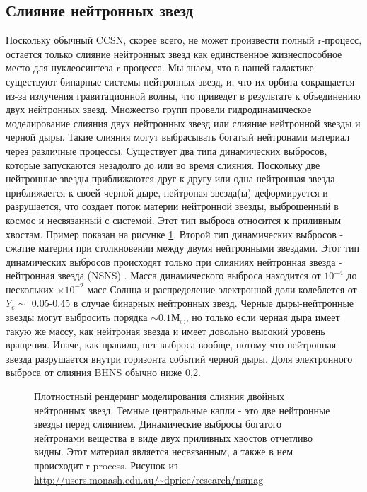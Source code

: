 \documentclass[%
master,    %
natbib,      %
subf,        %
href,        %
colorlinks,  %
]{disser}
\begin{document}
\subsection{Слияние нейтронных звезд}

Поскольку обычный CCSN, скорее всего, не может произвести полный r-процесс, остается только слияние нейтронных звезд как единственное жизнеспособное место для нуклеосинтеза r-процесса. Мы знаем, что в нашей галактике существуют бинарные системы нейтронных звезд, и, что их орбита сокращается из-за излучения гравитационной волны, что приведет в результате к объединению двух нейтронных звезд. Множество групп провели гидродинамическое моделирование слияния двух нейтронных звезд или слияние нейтронной звезды и черной дыры. Такие слияния могут выбрасывать богатый нейтронами материал через различные процессы. Существует два типа динамических выбросов, которые запускаются незадолго до или во время слияния. Поскольку две нейтронные звезды приближаются друг к другу или одна нейтронная звезда приближается к своей черной дыре, нейтроная звезда(ы) деформируется и разрушается, что создает поток материи нейтронной звезды, выброшенный в космос и несвязанный с системой. Этот тип выброса относится к приливным хвостам. Пример показан на рисунке \ref{ris:11}. Второй тип динамических выбросов - сжатие материи при столкновении между двумя нейтронными звездами. Этот тип динамических выбросов происходят только при слияниях нейтронная звезда - нейтронная звезда (NSNS) \cite{nsns}. Масса динамического выброса находится от $10^{-4}$ до нескольких $\times 10^{-2}$ масс Солнца и распределение электронной доли колеблется от $Y_e \sim$ 0.05-0.45 в случае бинарных нейтронных звезд. Черные дыры-нейтронные звезды могут выбросить порядка $\sim 0.1 М_\odot$, но только если черная дыра имеет такую же массу, как нейтроная звезда и имеет довольно высокий уровень вращения. Иначе, как правило, нет выброса вообще, потому что нейтронная звезда разрушается внутри горизонта событий черной дыры. Доля электронного выброса от слияния BHNS обычно ниже 0,2.

\begin{figure}[h]
	\caption{Плотностный рендеринг моделирования слияния двойных нейтронных звезд. Темные центральные капли - это две нейтронные звезды перед слиянием. Динамические выбросы богатого нейтронами вещества в виде двух приливных хвостов отчетливо видны. Этот материал является несвязанным, а также в нем происходит r-process. Рисунок из \url{http://users.monash.edu.au/~dprice/research/nsmag}}
	\label{ris:11}
\end{figure}
\end{document}
